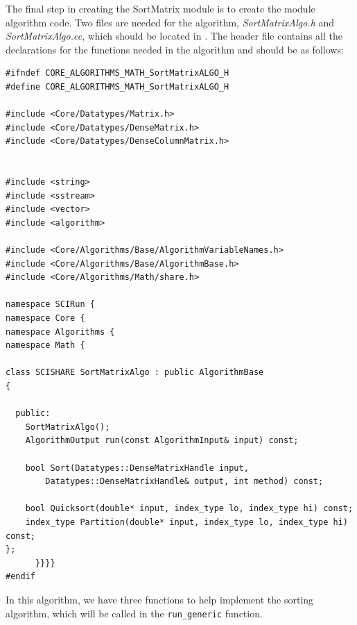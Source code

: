 \documentclass[fleqn,11pt,openany]{book}
\begin{document}
The final step in creating the SortMatrix module is to create the module algorithm code.  
Two files are needed for the algorithm, \emph{SortMatrixAlgo.h} and \emph{SortMatrixAlgo.cc}, which should be located in \emph{}. 
The header file contains all the declarations for the functions needed in the algorithm and should be as follows:
\begin{verbatim}
#ifndef CORE_ALGORITHMS_MATH_SortMatrixALGO_H
#define CORE_ALGORITHMS_MATH_SortMatrixALGO_H

#include <Core/Datatypes/Matrix.h>
#include <Core/Datatypes/DenseMatrix.h>
#include <Core/Datatypes/DenseColumnMatrix.h>


#include <string>
#include <sstream>
#include <vector>
#include <algorithm>

#include <Core/Algorithms/Base/AlgorithmVariableNames.h>
#include <Core/Algorithms/Base/AlgorithmBase.h>
#include <Core/Algorithms/Math/share.h>

namespace SCIRun {
namespace Core {
namespace Algorithms {
namespace Math {

class SCISHARE SortMatrixAlgo : public AlgorithmBase
{

  public:
    SortMatrixAlgo();
    AlgorithmOutput run(const AlgorithmInput& input) const;
  
    bool Sort(Datatypes::DenseMatrixHandle input, 
        Datatypes::DenseMatrixHandle& output, int method) const;
  
    bool Quicksort(double* input, index_type lo, index_type hi) const;
    index_type Partition(double* input, index_type lo, index_type hi) const;
};
      }}}}
#endif
\end{verbatim}
In this algorithm, we have three functions to help implement the sorting algorithm, which will be called in the \verb|run_generic| function.  
\end{document}
